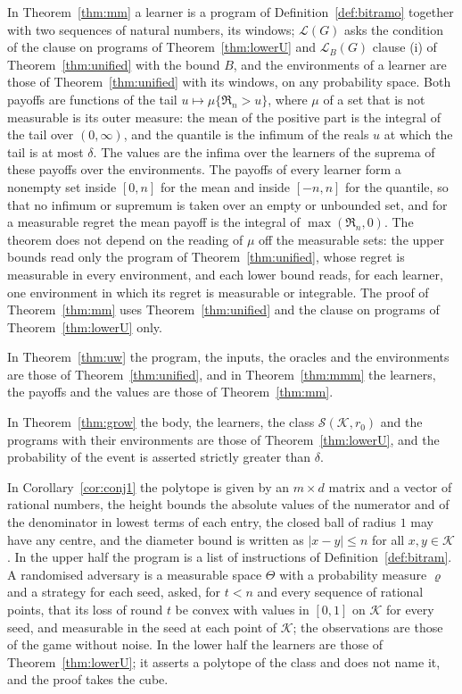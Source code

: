 \documentclass[11pt]{amsart}
\theoremstyle{definition}
\numberwithin{equation}{section}
\newcommand{\cK}{\mathcal{K}}
\newcommand{\Reg}{\mathfrak{R}}
\begin{document}
In Theorem~\ref{thm:mm} a learner is a program of Definition~\ref{def:bitramo} together with two sequences of natural numbers, its windows; $\mathcal L(G)$ asks the condition of the clause on programs of Theorem~\ref{thm:lowerU} and $\mathcal L_B(G)$ clause (i) of Theorem~\ref{thm:unified} with the bound $B$, and the environments of a learner are those of Theorem~\ref{thm:unified} with its windows, on any probability space. Both payoffs are functions of the tail $u\mapsto\mu\{\Reg_n>u\}$, where $\mu$ of a set that is not measurable is its outer measure: the mean of the positive part is the integral of the tail over $(0,\infty)$, and the quantile is the infimum of the reals $u$ at which the tail is at most $\delta$. The values are the infima over the learners of the suprema of these payoffs over the environments. The payoffs of every learner form a nonempty set inside $[0,n]$ for the mean and inside $[-n,n]$ for the quantile, so that no infimum or supremum is taken over an empty or unbounded set, and for a measurable regret the mean payoff is the integral of $\max(\Reg_n,0)$. The theorem does not depend on the reading of $\mu$ off the measurable sets: the upper bounds read only the program of Theorem~\ref{thm:unified}, whose regret is measurable in every environment, and each lower bound reads, for each learner, one environment in which its regret is measurable or integrable. The proof of Theorem~\ref{thm:mm} uses Theorem~\ref{thm:unified} and the clause on programs of Theorem~\ref{thm:lowerU} only.

In Theorem~\ref{thm:uw} the program, the inputs, the oracles and the environments are those of Theorem~\ref{thm:unified}, and in Theorem~\ref{thm:mmm} the learners, the payoffs and the values are those of Theorem~\ref{thm:mm}.

In Theorem~\ref{thm:grow} the body, the learners, the class $\mathcal S(\cK,r_0)$ and the programs with their environments are those of Theorem~\ref{thm:lowerU}, and the probability of the event is asserted strictly greater than $\delta$.

In Corollary~\ref{cor:conj1} the polytope is given by an $m\times d$ matrix and a vector of rational numbers, the height bounds the absolute values of the numerator and of the denominator in lowest terms of each entry, the closed ball of radius $1$ may have any centre, and the diameter bound is written as $|x-y|\le n$ for all $x,y\in\cK$. In the upper half the program is a list of instructions of Definition~\ref{def:bitram}. A randomised adversary is a measurable space $\Theta$ with a probability measure $\varrho$ and a strategy for each seed, asked, for $t<n$ and every sequence of rational points, that its loss of round $t$ be convex with values in $[0,1]$ on $\cK$ for every seed, and measurable in the seed at each point of $\cK$; the observations are those of the game without noise. In the lower half the learners are those of Theorem~\ref{thm:lowerU}; it asserts a polytope of the class and does not name it, and the proof takes the cube.
\end{document}
